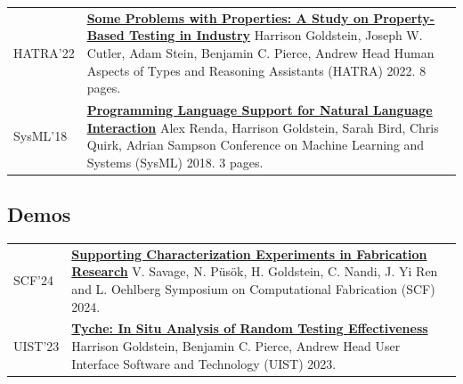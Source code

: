 \documentclass[a4paper]{article}
\newcommand{\semibf}{\fontseries{semibold}\selectfont}
\begin{document}
\begin{longtable}{@{}p{}p{}@{}}
    \\
  HATRA'22 &
    \href{https://harrisongoldste.in/papers/hatra2022.pdf}{\bf Some Problems with Properties: A Study on Property-Based Testing in Industry} \newline
    {\semibf Harrison Goldstein}, Joseph W. Cutler, Adam Stein, Benjamin C. Pierce, Andrew Head \newline
    Human Aspects of Types and Reasoning Assistants (HATRA) 2022. 8 pages.
    \\
  SysML'18 &
    \href{https://mlsys.org/Conferences/doc/2018/56.pdf}{\bf Programming Language Support for Natural Language Interaction} \newline
    Alex Renda, {\semibf Harrison Goldstein}, Sarah Bird, Chris Quirk, Adrian Sampson \newline
    Conference on Machine Learning and Systems (SysML) 2018. 3 pages.
\end{longtable}

\subsection*{Demos}
\vspace{-5mm}
\begin{longtable}{@{}p{}p{}@{}}
  SCF'24 &
    \href{https://dl.acm.org/doi/10.1145/3665662.3673270}{\bf Supporting Characterization Experiments in Fabrication Research} \newline
    V. Savage, N. Püsök, {\semibf H. Goldstein}, C. Nandi, J. Yi Ren and L. Oehlberg \newline
    Symposium on Computational Fabrication (SCF) 2024.
    \\
  UIST'23 &
    \href{https://dl.acm.org/doi/10.1145/3586182.3615788}{\bf Tyche: In Situ Analysis of Random Testing Effectiveness} \newline
    {\semibf Harrison Goldstein}, Benjamin C. Pierce, Andrew Head \newline
    User Interface Software and Technology (UIST) 2023.
\end{longtable}
\end{document}
